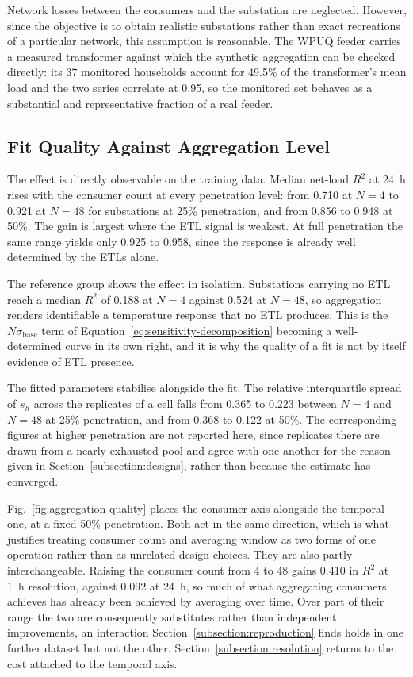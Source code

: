 \documentclass[9pt,journal,a4]{IEEEtran}
\begin{document}
Network losses between the consumers and the substation are neglected. However, since the objective is to obtain realistic substations rather than exact recreations of a particular network, this assumption is reasonable. The WPUQ feeder carries a measured transformer against which the synthetic aggregation can be checked directly: its 37 monitored households account for 49.5\% of the transformer's mean load and the two series correlate at 0.95, so the monitored set behaves as a substantial and representative fraction of a real feeder.


\subsection{Fit Quality Against Aggregation Level}
\label{subsection:fitquality}

The effect is directly observable on the training data. Median net-load $R^2$ at 24~h rises with the consumer count at every penetration level: from 0.710 at $N = 4$ to 0.921 at $N = 48$ for substations at 25\% penetration, and from 0.856 to 0.948 at 50\%. The gain is largest where the ETL signal is weakest. At full penetration the same range yields only 0.925 to 0.958, since the response is already well determined by the ETLs alone.

The reference group shows the effect in isolation. Substations carrying no ETL reach a median $R^2$ of 0.188 at $N = 4$ against 0.524 at $N = 48$, so aggregation renders identifiable a temperature response that no ETL produces. This is the $N \sigma_{\mathrm{base}}$ term of Equation~\eqref{eq:sensitivity-decomposition} becoming a well-determined curve in its own right, and it is why the quality of a fit is not by itself evidence of ETL presence.

The fitted parameters stabilise alongside the fit. The relative interquartile spread of $s_h$ across the replicates of a cell falls from 0.365 to 0.223 between $N = 4$ and $N = 48$ at 25\% penetration, and from 0.368 to 0.122 at 50\%. The corresponding figures at higher penetration are not reported here, since replicates there are drawn from a nearly exhausted pool and agree with one another for the reason given in Section~\ref{subsection:designs}, rather than because the estimate has converged.

Fig.~\ref{fig:aggregation-quality} places the consumer axis alongside the temporal one, at a fixed 50\% penetration. Both act in the same direction, which is what justifies treating consumer count and averaging window as two forms of one operation rather than as unrelated design choices. They are also partly interchangeable. Raising the consumer count from 4 to 48 gains 0.410 in $R^2$ at 1~h resolution, against 0.092 at 24~h, so much of what aggregating consumers achieves has already been achieved by averaging over time. Over part of their range the two are consequently substitutes rather than independent improvements, an interaction Section~\ref{subsection:reproduction} finds holds in one further dataset but not the other. Section~\ref{subsection:resolution} returns to the cost attached to the temporal axis.
\end{document}
